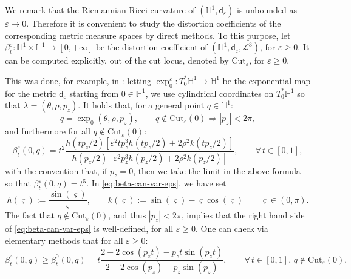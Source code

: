 \documentclass[11pt,a4paper]{article}
\theoremstyle{plain}
\theoremstyle{definition}
\theoremstyle{remark}
\numberwithin{equation}{section}
\renewcommand{\H}{\mathbb{H}}
\newcommand{\Cut}{\mathrm{Cut}}
\newcommand{\sfd}{\mathsf d}
\begin{document}
 We remark that the Riemannian Ricci curvature of $(\H^1,\sfd_\varepsilon)$ is unbounded as $\varepsilon\to 0$. Therefore it is convenient to study the distortion coefficients of the corresponding metric measure spaces by direct methods. To this purpose, let $\beta_t^\varepsilon : \H^1\times \H^1 \to [0,+\infty]$ be the distortion coefficient of $(\H^1,\sfd_\varepsilon,\mathscr{L}^3)$, for $\varepsilon\geq 0$. It can be computed explicitly, out of the cut locus, denoted by $\Cut_\varepsilon$, for $\varepsilon\geq 0$.

This was done, for example, in \cite[Sec.\@ 4.2]{RiffordCarnot}: letting $\exp_0^{\varepsilon}: T^*_0\H^1 \to \H^1$ be the exponential map for the metric $\sfd_\varepsilon$ starting from $0\in \H^1$, we use cylindrical  coordinates on $T^*_0\H^1$ so that $\lambda = (\theta,\rho,p_z)$. It holds that, for a general point $q\in \H^1$:
\begin{equation}\label{eq:cut-can-var-eps}
q = \exp_0(\theta,\rho,p_z), \qquad q\notin\Cut_\varepsilon(0) \Rightarrow |p_z|<2\pi,
\end{equation}
and furthermore for all $q\notin \Cut_\varepsilon(0)$:
\begin{equation}\label{eq:beta-can-var-eps}
\beta_t^\varepsilon(0,q)= t^2\frac{ h(tp_z/2)\left[\varepsilon^2 t p_z^3 h(tp_z/2) +2\rho^2 k(tp_z/2)\right]}{h(p_z/2)\left[\varepsilon^2 p_z^3 h(p_z/2) + 2\rho^2 k(p_z/2)\right]}, \qquad \forall\, t\in [0,1],
\end{equation}
with the convention that, if $p_z=0$, then we take the limit in the above formula so that $\beta_t^\varepsilon(0,q) = t^5$. In \eqref{eq:beta-can-var-eps}, we have set
\begin{equation}
h(\varsigma) := \frac{\sin(\varsigma)}{\varsigma}, \qquad k(\varsigma):=\sin(\varsigma) - \varsigma\cos(\varsigma)\qquad \varsigma \in (0,\pi).
\end{equation}
The fact that $q\notin \Cut_\varepsilon(0)$, and thus $|p_z|< 2\pi$, implies that the right hand side of \eqref{eq:beta-can-var-eps} is well-defined, for all $\varepsilon\geq 0$. One can check via elementary methods that for all $\varepsilon\geq 0$:
\begin{equation}
\beta_t^\varepsilon(0,q) \geq \beta_t^0(0,q) = t \frac{2-2\cos(p_z t)- p_z t \sin(p_z t)}{2-2\cos(p_z)-p_z \sin(p_z)}, \qquad \forall\, t \in [0,1],\,q\notin \Cut_\varepsilon(0).
\end{equation}
\end{document}
